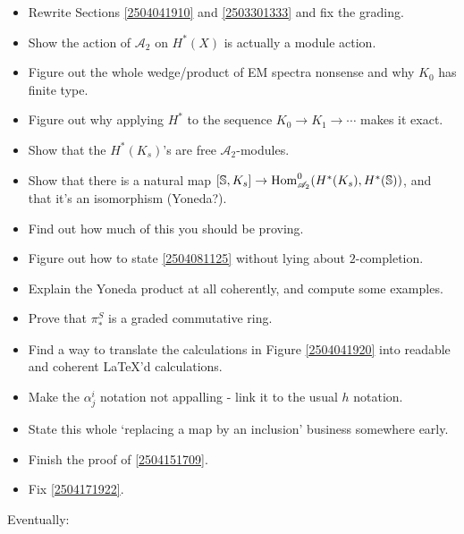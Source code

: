 \documentclass{MetricNotes2023}
\def\bb{\ensuremath\mathbb}
\def\A{\ensuremath{\mathscr{A}_2}}
\DeclareMathOperator{\Hom}{Hom}
\begin{document}
\begin{itemize}
\item Rewrite Sections \ref{2504041910} and \ref{2503301333} and fix the grading.

\item Show the action of \(\A\) on \(H^*(X)\) is actually a module action.

\item Figure out the whole wedge/product of EM spectra nonsense and why \(K_0\) has finite type.

\item Figure out why applying \(H^*\) to the sequence \(K_0\to K_1 \to \cdots\) makes it exact.

\item Show that the \(H^*(K_s)\)'s are free \(\A\)-modules.

\item Show that there is a natural map \([\bb{S}, K_s]\to \Hom^0_{\A}(H^*(K_s), H^*(\bb{S}))\), and that it's an isomorphism (Yoneda?). 

\item Find out how much of this you should be proving.

\item Figure out how to state \ref{2504081125} without lying about \(2\)-completion.

\item Explain the Yoneda product at all coherently, and compute some examples.

\item Prove that \(\pi_*^S\) is a graded commutative ring.

\item Find a way to translate the calculations in Figure \ref{2504041920} into readable and coherent LaTeX'd calculations.

\item Make the \(\alpha^i_j\) notation not appalling - link it to the usual \(h\) notation.

\item State this whole `replacing a map by an inclusion' business somewhere early.

\item Finish the proof of \ref{2504151709}.

\item Fix \ref{2504171922}.
\end{itemize}

Eventually:
\end{document}
